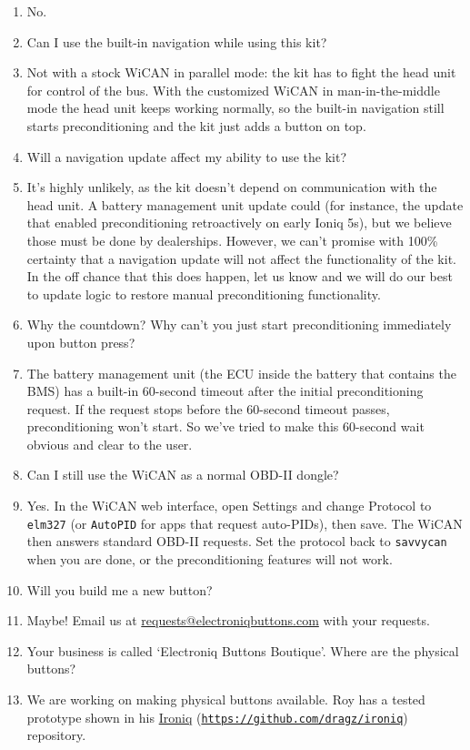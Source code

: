 \documentclass[superscriptaddress,onecolumn,floatfix]{revtex4-2}
\begin{document}
\begin{enumerate}
  \item[A:] No.
  \item[Q:] Can I use the built-in navigation while using this kit?
  \item[A:] Not with a stock WiCAN in parallel mode: the kit has to fight the head unit for control of the bus. With the customized WiCAN in man-in-the-middle mode the head unit keeps working normally, so the built-in navigation still starts preconditioning and the kit just adds a button on top.
  \item[Q:] Will a navigation update affect my ability to use the kit?
  \item[A:] It's highly unlikely, as the kit doesn't depend on communication with the head unit. A battery management unit update could (for instance, the update that enabled preconditioning retroactively on early Ioniq 5s), but we believe those must be done by dealerships. However, we can't promise with 100\% certainty that a navigation update will not affect the functionality of the kit. In the off chance that this does happen, let us know and we will do our best to update logic to restore manual preconditioning functionality.
  \item[Q:] Why the countdown? Why can't you just start preconditioning immediately upon button press?
  \item[A:] The battery management unit (the ECU inside the battery that contains the BMS) has a built-in 60-second timeout after the initial preconditioning request. If the request stops before the 60-second timeout passes, preconditioning won't start. So we've tried to make this 60-second wait obvious and clear to the user.
  \item[Q:] Can I still use the WiCAN as a normal OBD-II dongle?
  \item[A:] Yes. In the WiCAN web interface, open Settings and change Protocol to \texttt{elm327} (or \texttt{AutoPID} for apps that request auto-PIDs), then save. The WiCAN then answers standard OBD-II requests. Set the protocol back to \texttt{savvycan} when you are done, or the preconditioning features will not work.
  \item[Q:] Will you build me a new button?
  \item[A:] Maybe! Email us at \href{mailto:requests@electroniqbuttons.com}{requests@electroniqbuttons.com} with your requests.
  \item[Q:] Your business is called `Electroniq Buttons Boutique'. Where are the physical buttons?
  \item[A:] We are working on making physical buttons available. Roy has a tested prototype shown in his \href{https://github.com/dragz/ironiq}{Ironiq} (\href{https://github.com/dragz/ironiq}{\nolinkurl{https://github.com/dragz/ironiq}}) repository.
\end{enumerate}
\end{document}
